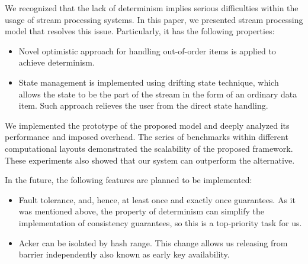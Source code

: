 
\label {fs-conclusions}

We recognized that the lack of determinism implies serious difficulties within the usage of stream processing systems. In this paper, we presented stream processing model that resolves this issue. Particularly, it has the following properties:

\begin{itemize}
  \item Novel optimistic approach for handling out-of-order items is applied to achieve determinism.
  \item State management is implemented using drifting state technique, which allows the state to be the part of the stream in the form of an ordinary data item. Such approach relieves the user from the direct state handling.
\end{itemize}

We implemented the prototype of the proposed model and deeply analyzed its performance and imposed overhead. The series of benchmarks within different computational layouts demonstrated the scalability of the proposed framework. These experiments also showed that our system can outperform the alternative.

In the future, the following features are planned to be implemented:
\begin{itemize}
  \item Fault tolerance, and, hence, at least once and exactly once guarantees. As it was mentioned above, the property of determinism can simplify the implementation of consistency guarantees, so this is a top-priority task for us.
  \item Acker can be isolated by hash range. This change allows us releasing from barrier independently also known as early key availability.
\end{itemize}
